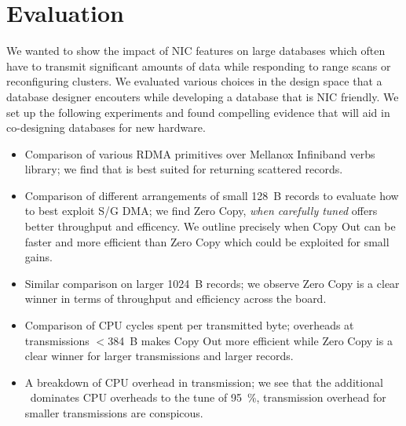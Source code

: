 \section{Evaluation}
We wanted to show the impact of NIC features on large databases which often have to 
transmit significant amounts of data while responding to range scans or reconfiguring clusters. 
We evaluated various choices in the design space that a database designer encouters while developing 
a database that is NIC friendly. We set up the following experiments and found compelling 
evidence that will aid in co-designing databases for new hardware.
\begin{itemize}
\item Comparison of various RDMA primitives over Mellanox Infiniband verbs library; we find that  is best suited for returning scattered records.
\item Comparison of different arrangements of small 128~B records to evaluate how to best exploit S/G DMA; we find Zero Copy, {\em when carefully tuned} offers better throughput and efficency. We outline precisely when Copy Out can be faster 
and more efficient than Zero Copy which could be exploited for small gains.
\item Similar comparison on larger 1024~B records; we observe Zero Copy is a clear winner in terms of throughput and efficiency across the board.
\item Comparison of CPU cycles spent per transmitted byte; overheads at transmissions $<$384~B makes Copy Out more efficient while Zero Copy is a clear winner for larger transmissions and larger records.
\item A breakdown of CPU overhead in transmission; we see that the additional \memcpy ~dominates CPU overheads to the tune of 95~\%, transmission overhead for smaller transmissions are conspicous.
\end{itemize}



